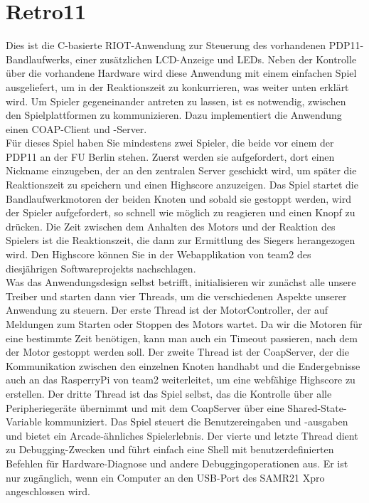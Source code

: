 \documentclass[a4paper]{article}
\begin{document}
\section{Retro11}
  Dies ist die C-basierte RIOT-Anwendung zur Steuerung des vorhandenen
  PDP11-Bandlaufwerks, einer zusätzlichen LCD-Anzeige und LEDs. Neben der
  Kontrolle über die vorhandene Hardware wird diese Anwendung mit einem einfachen
  Spiel ausgeliefert, um in der Reaktionszeit zu konkurrieren, was weiter unten
  erklärt wird. Um Spieler gegeneinander antreten zu lassen, ist es notwendig,
  zwischen den Spielplattformen zu kommunizieren. Dazu implementiert die
  Anwendung einen COAP-Client und -Server.\\
  Für dieses Spiel haben Sie mindestens zwei Spieler, die beide vor einem der
  PDP11 an der FU Berlin stehen. Zuerst werden sie aufgefordert, dort einen
  Nickname einzugeben, der an den zentralen Server geschickt wird, um später die
  Reaktionszeit zu speichern und einen Highscore anzuzeigen. Das Spiel startet
  die Bandlaufwerkmotoren der beiden Knoten und sobald sie gestoppt werden, wird
  der Spieler aufgefordert, so schnell wie möglich zu reagieren und einen Knopf
  zu drücken. Die Zeit zwischen dem Anhalten des Motors und der Reaktion des
  Spielers ist die Reaktionszeit, die dann zur Ermittlung des Siegers
  herangezogen wird. Den Highscore können Sie in der Webapplikation von team2 des
  diesjährigen Softwareprojekts nachschlagen.\\
  Was das Anwendungsdesign selbst betrifft, initialisieren wir zunächst alle
  unsere Treiber und starten dann vier Threads, um die verschiedenen Aspekte
  unserer Anwendung zu steuern. Der erste Thread ist der MotorController, der auf
  Meldungen zum Starten oder Stoppen des Motors wartet. Da wir die Motoren für
  eine bestimmte Zeit benötigen, kann man auch ein Timeout passieren, nach dem
  der Motor gestoppt werden soll. Der zweite Thread ist der CoapServer, der die
  Kommunikation zwischen den einzelnen Knoten handhabt und die Endergebnisse auch
  an das RasperryPi von team2 weiterleitet, um eine webfähige Highscore zu
  erstellen. Der dritte Thread ist das Spiel selbst, das die Kontrolle über alle
  Peripheriegeräte übernimmt und mit dem CoapServer über eine
  Shared-State-Variable kommuniziert. Das Spiel steuert die Benutzereingaben und
  -ausgaben und bietet ein Arcade-ähnliches Spielerlebnis. Der vierte und letzte
  Thread dient zu Debugging-Zwecken und führt einfach eine Shell mit
  benutzerdefinierten Befehlen für Hardware-Diagnose und andere
  Debuggingoperationen aus. Er ist nur zugänglich, wenn ein Computer an den
  USB-Port des SAMR21 Xpro angeschlossen wird.\\
\end{document}
